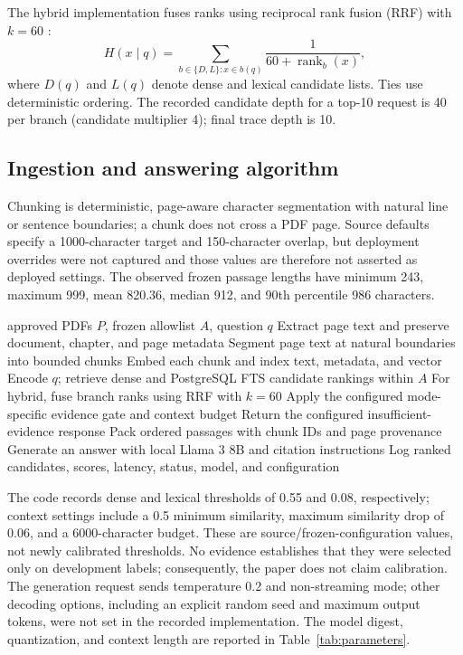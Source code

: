 \documentclass[conference]{IEEEtran}
\begin{document}
The hybrid implementation fuses ranks using reciprocal rank fusion (RRF) with $k=60$ \cite{r7,r50}:
\begin{equation}
H(x\mid q)=\sum_{b\in\{D,L\}:x\in b(q)}\frac{1}{60+\operatorname{rank}_b(x)},
\end{equation}
where $D(q)$ and $L(q)$ denote dense and lexical candidate lists. Ties use deterministic ordering. The recorded candidate depth for a top-10 request is 40 per branch (candidate multiplier 4); final trace depth is 10.

\subsection{Ingestion and answering algorithm}
Chunking is deterministic, page-aware character segmentation with natural line or sentence boundaries; a chunk does not cross a PDF page. Source defaults specify a 1000-character target and 150-character overlap, but deployment overrides were not captured and those values are therefore not asserted as deployed settings. The observed frozen passage lengths have minimum 243, maximum 999, mean 820.36, median 912, and 90th percentile 986 characters.

\begin{algorithm}[t]
\caption{LearnMateAI page-aware RAG and evaluation trace}
\label{alg:pipeline}
\begin{algorithmic}[1]
\REQUIRE approved PDFs $P$, frozen allowlist $A$, question $q$
  \STATE Extract page text and preserve document, chapter, and page metadata
  \STATE Segment page text at natural boundaries into bounded chunks
  \STATE Embed each chunk and index text, metadata, and vector
\ENDFOR
\STATE Encode $q$; retrieve dense and PostgreSQL FTS candidate rankings within $A$
\STATE For hybrid, fuse branch ranks using RRF with $k=60$
\STATE Apply the configured mode-specific evidence gate and context budget
  \STATE Return the configured insufficient-evidence response
\ELSE
  \STATE Pack ordered passages with chunk IDs and page provenance
  \STATE Generate an answer with local Llama 3 8B and citation instructions
\ENDIF
\STATE Log ranked candidates, scores, latency, status, model, and configuration
\end{algorithmic}
\end{algorithm}

The code records dense and lexical thresholds of 0.55 and 0.08, respectively; context settings include a 0.5 minimum similarity, maximum similarity drop of 0.06, and a 6000-character budget. These are source/frozen-configuration values, not newly calibrated thresholds. No evidence establishes that they were selected only on development labels; consequently, the paper does not claim calibration. The generation request sends temperature 0.2 and non-streaming mode; other decoding options, including an explicit random seed and maximum output tokens, were not set in the recorded implementation. The model digest, quantization, and context length are reported in Table~\ref{tab:parameters}.
\end{document}
